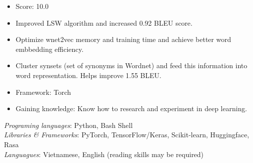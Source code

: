 \documentclass[letter]{cv-template}
\begin{document}

        {}{
            \begin{itemize}
                \setlength\itemsep{0.25pt}
                \item Score: 10.0
                \item Improved LSW algorithm and increased 0.92 BLEU score.
                \item Optimize wnet2vec memory and training time and achieve better word embbedding efficiency.
                \item Cluster synsets (set of synonyms in Wordnet) and feed this information into word representation. Helps improve 1.55 BLEU.
                \item Framework: Torch
                \item Gaining knowledge: Know how to research and experiment in deep learning.
            \end{itemize} \leavevmode
        }
        \textit{Programing languages}: Python, Bash Shell \\
        \textit{Libraries \& Frameworks}: PyTorch, TensorFlow/Keras, Scikit-learn, Huggingface, Rasa \\
        \textit{Languagues}: Vietnamese, English (reading skills may be required)
\end{document}
